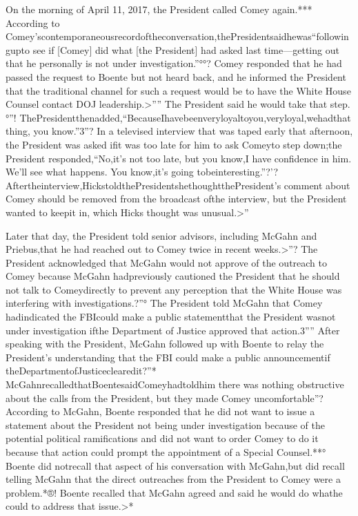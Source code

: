 On the morning of April 11, 2017, the President called Comey again.*** According to Comey’scontemporaneousrecordoftheconversation,thePresidentsaidhewas“followingupto see if [Comey] did what [the President] had asked last time—getting out that he personally is not under investigation.”°°? Comey responded that he had passed the request to Boente but not heard back, and he informed the President that the traditional channel for such a request would be to have the White House Counsel contact DOJ leadership.>”” The President said he would take that step.°”! ThePresidentthenadded,“BecauseIhavebeenveryloyaltoyou,veryloyal,wehadthat thing, you know.”3”? In a televised interview that was taped early that afternoon, the President was asked ifit was too late for him to ask Comeyto step down;the President responded,“No,it’s not too late, but you know,I have confidence in him. We’ll see what happens. You know,it’s going tobeinteresting.”?’? Aftertheinterview,HickstoldthePresidentshethoughtthePresident’s comment about Comey should be removed from the broadcast ofthe interview, but the President wanted to keepit in, which Hicks thought was unusual.>”

Later that day, the President told senior advisors, including McGahn and Priebus,that he had reached out to Comey twice in recent weeks.>”? The President acknowledged that McGahn would not approve of the outreach to Comey because McGahn hadpreviously cautioned the President that he should not talk to Comeydirectly to prevent any perception that the White House was interfering with investigations.?”° The President told McGahn that Comey hadindicated the FBIcould make a public statementthat the President wasnot under investigation ifthe Department of Justice approved that action.3”” After speaking with the President, McGahn followed up with Boente to relay the President’s understanding that the FBI could make a public announcementif theDepartmentofJusticeclearedit?”* McGahnrecalledthatBoentesaidComeyhadtoldhim there was nothing obstructive about the calls from the President, but they made Comey uncomfortable”? According to McGahn, Boente responded that he did not want to issue a statement about the President not being under investigation because of the potential political ramifications and did not want to order Comey to do it because that action could prompt the appointment of a Special Counsel.**° Boente did notrecall that aspect of his conversation with McGahn,but did recall telling McGahn that the direct outreaches from the President to Comey were a problem.*®! Boente recalled that McGahn agreed and said he would do whathe could to address that issue.>*

